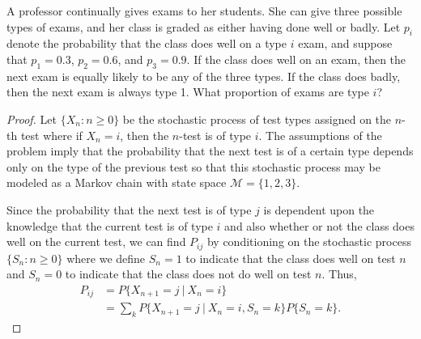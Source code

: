 \begin{problem}{4.33}
  A professor continually gives exams to her students. She can give three possible types
  of exams, and her class is graded as either having done well or badly. Let $p_i$
  denote the probability that the class does well on a type $i$ exam, and suppose that
  $p_1 = 0.3$, $p_2 = 0.6$, and $p_3 = 0.9$. If the class does well on an exam,
  then the next exam is equally likely to be any of the three types. If the class
  does badly, then the next exam is always type 1. What proportion of exams
  are type $i$?
\end{problem}

\begin{proof}
  Let $\{X_n : n\geq 0\}$ be the stochastic process of test types assigned on the $n$-th
  test where if $X_n = i$, then the $n$-test is of type $i$. The assumptions of the problem
  imply that the probability that the next test is of a certain type depends only on the
  type of the previous test so that this stochastic process may be modeled as
  a Markov chain with state space $\mathcal{M} = \{1, 2, 3\}$.

  Since the probability that the next test is of type $j$ is dependent upon the
  knowledge that the current test is of type $i$ and also whether or not the class does
  well on the current test, we can find $P_{ij}$ by conditioning on the stochastic process
  $\{S_n : n \geq 0\}$ where we define $S_n = 1$ to indicate that the class does
  well on test $n$ and $S_n = 0$ to indicate that the class does not do well on test $n$.
  Thus,
  \begin{align*}
    P_{ij} &= P\{X_{n+1} = j \ |\ X_n = i\} \\
    &= \sum_{k}P\{X_{n+1} = j \ |\ X_n = i, S_n = k\}P\{S_n = k\}.
  \end{align*}


\end{proof}
